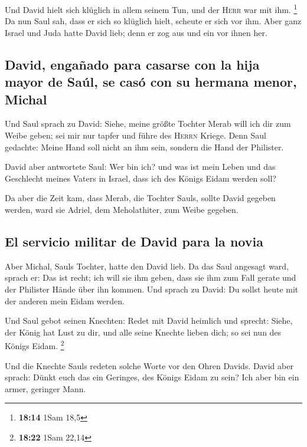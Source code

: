  Und David hielt sich klüglich in allem seinem Tun, und
der \textsc{Herr} war mit ihm. \footnote{\textbf{18:14} 1Sam 18,5}
 Da nun Saul sah, dass er sich so klüglich hielt, scheute
er sich vor ihm.  Aber ganz Israel und Juda hatte David
lieb; denn er zog aus und ein vor ihnen her.

\hypertarget{david-engauxf1ado-para-casarse-con-la-hija-mayor-de-sauxfal-se-casuxf3-con-su-hermana-menor-michal}{%
\subsection{David, engañado para casarse con la hija mayor de Saúl, se
casó con su hermana menor,
Michal}\label{david-engauxf1ado-para-casarse-con-la-hija-mayor-de-sauxfal-se-casuxf3-con-su-hermana-menor-michal}}

 Und Saul sprach zu David: Siehe, meine größte Tochter
Merab will ich dir zum Weibe geben; sei mir nur tapfer und führe des
\textsc{Herrn} Kriege. Denn Saul gedachte: Meine Hand soll nicht an ihm
sein, sondern die Hand der Philister.

 David aber antwortete Saul: Wer bin ich? und was ist
mein Leben und das Geschlecht meines Vaters in Israel, dass ich des
Königs Eidam werden soll?

 Da aber die Zeit kam, dass Merab, die Tochter Sauls,
sollte David gegeben werden, ward sie Adriel, dem Meholathiter, zum
Weibe gegeben.

\hypertarget{el-servicio-militar-de-david-para-la-novia}{%
\subsection{El servicio militar de David para la
novia}\label{el-servicio-militar-de-david-para-la-novia}}

 Aber Michal, Sauls Tochter, hatte den David lieb. Da das
Saul angesagt ward, sprach er: Das ist recht;  ich will
sie ihm geben, dass sie ihm zum Fall gerate und der Philister Hände über
ihn kommen. Und sprach zu David: Du sollst heute mit der anderen mein
Eidam werden.

 Und Saul gebot seinen Knechten: Redet mit David heimlich
und sprecht: Siehe, der König hat Lust zu dir, und alle seine Knechte
lieben dich; so sei nun des Königs Eidam. \footnote{\textbf{18:22} 1Sam
  22,14}

 Und die Knechte Sauls redeten solche Worte vor den Ohren
Davids. David aber sprach: Dünkt euch das ein Geringes, des Königs Eidam
zu sein? Ich aber bin ein armer, geringer Mann.

